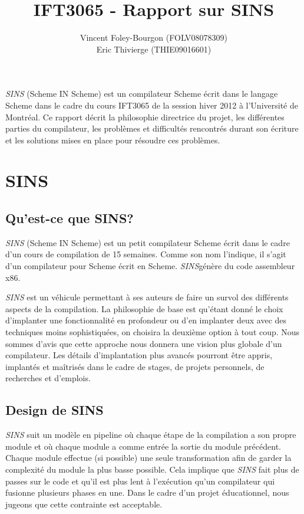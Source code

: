 \documentclass[11pt]{report}
\begin{document}
\newcommand{\sins}{\emph{SINS}}
\newcommand{\bop}{\textbf{(}}
\newcommand{\bcp}{\textbf{)}}

\title{IFT3065 - Rapport sur SINS}
\author{Vincent Foley-Bourgon (FOLV08078309) \\
Eric Thivierge (THIE09016601)}
\maketitle

\abstract

\sins{} (Scheme IN Scheme) est un compilateur Scheme écrit dans le
langage Scheme dans le cadre du cours IFT3065 de la session hiver 2012
à l'Université de Montréal.  Ce rapport décrit la philosophie
directrice du projet, les différentes parties du compilateur, les
problèmes et difficultés rencontrés durant son écriture et les
solutions mises en place pour résoudre ces problèmes.

\chapter{SINS}

\section{Qu'est-ce que SINS?}

\sins{} (Scheme IN Scheme) est un petit compilateur Scheme écrit
dans le cadre d'un cours de compilation de 15 semaines.  Comme son nom
l'indique, il s'agit d'un compilateur pour Scheme écrit en Scheme.
\sins génère du code assembleur x86.

\sins{} est un véhicule permettant à ses auteurs de faire un
survol des différents aspects de la compilation.  La philosophie de
base est qu'étant donné le choix d'implanter une fonctionnalité en
profondeur ou d'en implanter deux avec des techniques moins
sophistiquées, on choisira la deuxième option à tout coup.  Nous
sommes d'avis que cette approche nous donnera une vision plus globale
d'un compilateur.  Les détails d'implantation plus avancés pourront
être appris, implantés et maîtrisés dans le cadre de stages, de
projets personnels, de recherches et d'emplois.


\section{Design de SINS}

\sins{} suit un modèle en pipeline où chaque étape de la compilation a
son propre module et où chaque module a comme entrée la sortie du
module précédent.  Chaque module effectue (si possible) une seule
transformation afin de garder la complexité du module la plus basse
possible.  Cela implique que \sins{} fait plus de passes sur le code et
qu'il est plus lent à l'exécution qu'un compilateur qui fusionne
plusieurs phases en une.  Dans le cadre d'un projet éducationnel,
nous jugeons que cette contrainte est acceptable.
\end{document}
